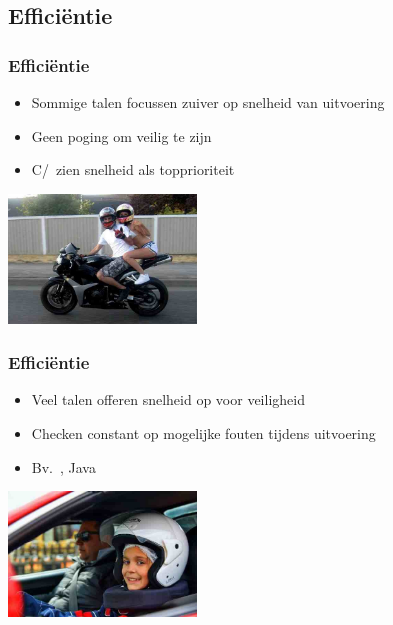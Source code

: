 \subsection{Effici\"entie}

\begin{frame}
  \tableofcontents[currentsubsection]
\end{frame}

\begin{frame}
  \frametitle{Effici\"entie}
  \begin{itemize}
    \item Sommige talen focussen zuiver op snelheid van uitvoering
    \item Geen poging om veilig te zijn
    \item C/\cpp\ zien snelheid als topprioriteit
  \end{itemize}
  \begin{center}
    \includegraphics[width=5cm]{unsafe-driving.jpg}
  \end{center}
\end{frame}

\begin{frame}
  \frametitle{Effici\"entie}
  \begin{itemize}
    \item Veel talen offeren snelheid op voor veiligheid
    \item Checken constant op mogelijke fouten tijdens uitvoering
    \item Bv.~\csharp, Java
  \end{itemize}
  \begin{center}
    \includegraphics[width=5cm]{drive-safely.jpg}
  \end{center}
\end{frame}

